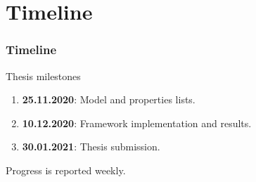 \documentclass{beamer}
\begin{document}
\section{Timeline}
\begin{frame}
  \frametitle{Timeline}
  Thesis milestones
  \begin{enumerate}
  \item \textbf{25.11.2020}: Model and properties lists.
  \item \textbf{10.12.2020}: Framework implementation and results.
  \item \textbf{30.01.2021}: Thesis submission.
  \end{enumerate}
  Progress is reported weekly.
\end{frame}
\end{document}
